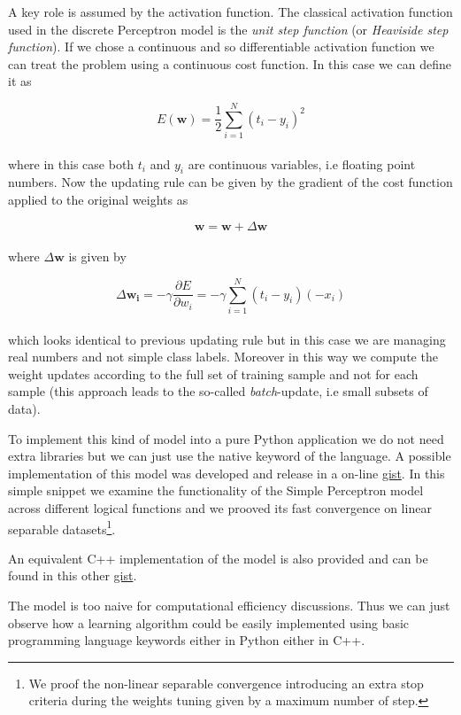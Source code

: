\documentclass{standalone}
\begin{document}
A key role is assumed by the activation function.
The classical activation function used in the discrete Perceptron model is the \emph{unit step function} (or \emph{Heaviside step function}).
If we chose a continuous and so differentiable activation function we can treat the problem using a continuous cost function.
In this case we can define it as

$$
E(\mathbf{w}) = \frac{1}{2}\sum_{i=1}^{N}\left( t_i - y_i \right)^2
$$
\\
where in this case both $t_i$ and $y_i$ are continuous variables, i.e floating point numbers.
Now the updating rule can be given by the gradient of the cost function applied to the original weights as

$$
\mathbf{w} = \mathbf{w} + \Delta\mathbf{w}
$$
\\
where $\Delta\mathbf{w}$ is given by

$$
\Delta\mathbf{w_i} = -\gamma\frac{\partial E}{\partial w_i} = -\gamma\sum_{i=1}^{N} \left( t_i - y_i \right)\left(-x_i \right)
$$
\\
which looks identical to previous updating rule but in this case we are managing real numbers and not simple class labels.
Moreover in this way we compute the weight updates according to the full set of training sample and not for each sample (this approach leads to the so-called \emph{batch}-update, i.e small subsets of data).

To implement this kind of model into a pure \textsf{Python} application we do not need extra libraries but we can just use the native keyword of the language.
A possible implementation of this model was developed and release in a on-line \href{https://gist.github.com/Nico-Curti/358b7a2ffed1abbb57ee87a5338ca073}{gist}.
In this simple snippet we examine the functionality of the Simple Perceptron model across different logical functions and we prooved its fast convergence on linear separable datasets\footnote{
  We proof the non-linear separable convergence introducing an extra stop criteria during the weights tuning given by a maximum number of step.
}.

An equivalent \textsf{C++} implementation of the model is also provided and can be found in this other \href{https://gist.github.com/Nico-Curti/856c3baf523bc5d01b1e7dfe2515c0e2}{gist}.

The model is too naive for computational efficiency discussions.
Thus we can just observe how a learning algorithm could be easily implemented using basic programming language keywords either in \textsf{Python} either in \textsf{C++}.
\end{document}
